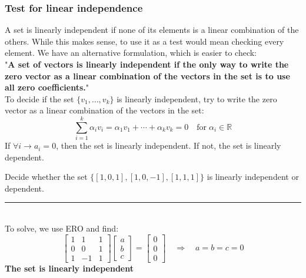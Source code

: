 \documentclass[a4paper, 9pt]{extarticle}
\begin{document}
\subsubsection{Test for linear independence}
A set is linearly independent if none of its elements is a linear combination of the others.  While this makes sense, to use it as a test would mean checking every element. We have an alternative formulation, which is easier to check: \\[2ex]
"\textbf{A set of vectors is linearly independent if the only way to write the zero vector as a linear combination of the vectors in the set is to use all zero coefficients.}" \\[2ex]
To decide if the set $\{v_1, \dots, v_k\}$ is linearly independent, try to write the zero vector as a linear combination of the vectors in the set:
$$
  \sum_{i=1}^k \alpha_i v_i = \alpha_1 v_1 + \cdots + \alpha_k v_k = 0 \quad \text{for} \; \alpha_i \in \mathbb{R}
$$
If $\forall i \rightarrow a_i = 0$, then the set is linearly independent. If not, the set is linearly dependent.
\begin{examplebox}{}{}
  Decide whether the set $\{[1,0,1], [1,0,-1], [1,1,1]\}$ is linearly independent or dependent. \\
  \rule{\textwidth}{1px} \\
  To solve, we use ERO and find:
  $$
    \begin{bmatrix}
      1 & 1  & 1 \\
      0 & 0  & 1 \\
      1 & -1 & 1
    \end{bmatrix}
    \begin{bmatrix}
      a \\
      b \\
      c
    \end{bmatrix}
    =
    \begin{bmatrix}
      0 \\
      0 \\
      0
    \end{bmatrix}
    \quad \Rightarrow \quad
    a = b = c = 0
  $$
  \textbf{The set is linearly independent}
\end{examplebox}
\end{document}
